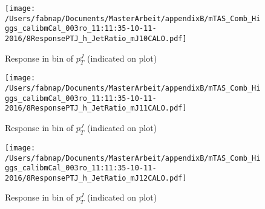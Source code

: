 \begin{figure}

\texttt{[image: /Users/fabnap/Documents/MasterArbeit/appendixB/mTAS\_Comb\_Higgs\_calibmCal\_003ro\_11:11:35-10-11-2016/8ResponsePTJ\_h\_JetRatio\_mJ10CALO.pdf]}
\caption{Response in bin of  $p_{T}^{J}$ (indicated on plot)} 

\end{figure}

\begin{figure}

\texttt{[image: /Users/fabnap/Documents/MasterArbeit/appendixB/mTAS\_Comb\_Higgs\_calibmCal\_003ro\_11:11:35-10-11-2016/8ResponsePTJ\_h\_JetRatio\_mJ11CALO.pdf]}
\caption{Response in bin of  $p_{T}^{J}$ (indicated on plot)} 

\end{figure}

\begin{figure}

\texttt{[image: /Users/fabnap/Documents/MasterArbeit/appendixB/mTAS\_Comb\_Higgs\_calibmCal\_003ro\_11:11:35-10-11-2016/8ResponsePTJ\_h\_JetRatio\_mJ12CALO.pdf]}
\caption{Response in bin of  $p_{T}^{J}$ (indicated on plot)} 

\end{figure}
